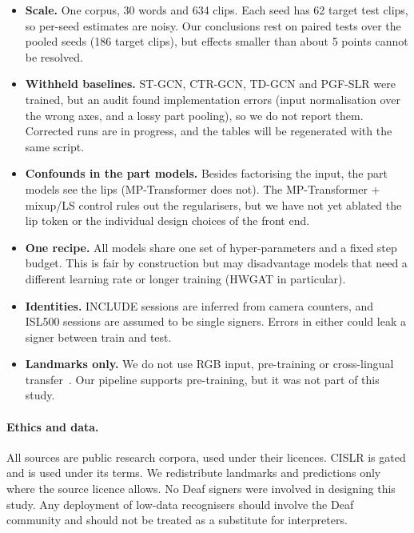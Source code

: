 \documentclass[11pt]{article}
\begin{document}
\begin{itemize}
  \item \textbf{Scale.} One corpus, 30 words and 634 clips. Each seed has 62 target test
  clips, so per-seed estimates are noisy. Our conclusions rest on paired tests over the pooled
  seeds (186 target clips), but effects smaller than about 5 points cannot be resolved.
  \item \textbf{Withheld baselines.} ST-GCN, CTR-GCN, TD-GCN and PGF-SLR were trained, but an
  audit found implementation errors (input normalisation over the wrong axes, and a lossy part
  pooling), so we do not report them. Corrected runs are in progress, and the tables will be
  regenerated with the same script.
  \item \textbf{Confounds in the part models.} Besides factorising the input, the part models
  see the lips (MP-Transformer does not). The MP-Transformer + mixup/LS control rules out the
  regularisers, but we have not yet ablated the lip token or the individual design choices of
  the front end.
  \item \textbf{One recipe.} All models share one set of hyper-parameters and a fixed step
  budget. This is fair by construction but may disadvantage models that need a different
  learning rate or longer training (HWGAT in particular).
  \item \textbf{Identities.} INCLUDE sessions are inferred from camera counters, and ISL500
  sessions are assumed to be single signers. Errors in either could leak a signer between
  train and test.
  \item \textbf{Landmarks only.} We do not use RGB input, pre-training or cross-lingual
  transfer~\citep{selvaraj2022openhands}. Our pipeline supports pre-training, but it was not
  part of this study.
\end{itemize}

\paragraph{Ethics and data.}
All sources are public research corpora, used under their licences. CISLR is gated and is
used under its terms. We redistribute landmarks and predictions only where the source licence
allows. No Deaf signers were involved in designing this study. Any deployment of low-data
recognisers should involve the Deaf community and should not be treated as a substitute for
interpreters.

\end{document}
